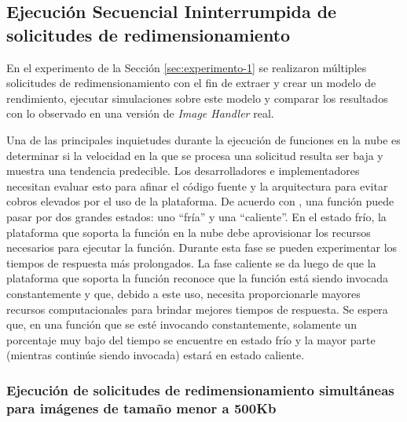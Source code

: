 
\subsection{Ejecución Secuencial Ininterrumpida de solicitudes de redimensionamiento}\label{sec:experimento-2}

En el experimento de la Sección \ref{sec:experimento-1} se realizaron múltiples solicitudes de redimensionamiento con el fin de extraer y crear un modelo de rendimiento, ejecutar simulaciones sobre este modelo y comparar los resultados con lo observado en una versión de \emph{Image Handler} real.

Una de las principales inquietudes durante la ejecución de funciones en la nube es determinar si la velocidad en la que se procesa una solicitud resulta ser baja y muestra una tendencia predecible. Los desarrolladores e implementadores necesitan evaluar esto para afinar el código fuente y la arquitectura para evitar cobros elevados por el uso de la plataforma.
De acuerdo con \cite{8360324}, una función puede pasar por dos grandes estados: uno ``fría'' y una ``caliente''. En el estado frío, la plataforma que soporta la función en la nube debe aprovisionar los recursos necesarios para ejecutar la función. Durante esta fase se pueden experimentar los tiempos de respuesta más prolongados. La fase caliente se da luego de que la plataforma que soporta la función reconoce que la función está siendo invocada constantemente y que, debido a este uso, necesita proporcionarle mayores recursos computacionales para brindar mejores tiempos de respuesta. Se espera que, en una función que se esté invocando constantemente, solamente un porcentaje muy bajo del tiempo se encuentre en estado frío y la mayor parte (mientras continúe siendo invocada) estará en estado caliente.


\subsubsection{Ejecución de solicitudes de redimensionamiento simultáneas para imágenes de tamaño menor a 500Kb}


